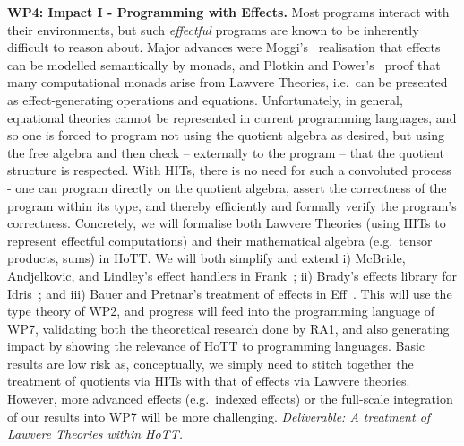 \documentclass[a4paper,11pt]{article}
\newcommand{\eg}{{e.g.}\ }
\begin{document}
{\bf WP4: Impact I - Programming with Effects.}
Most programs interact with their environments,
but such \emph{effectful} programs are known to be inherently difficult to
reason about.
Major advances were Moggi's~\cite{moggi:monad} realisation that effects can be modelled semantically by monads, and
Plotkin and Power's~\cite{PlotkinPower:Lawvere} proof that many
computational monads arise from Lawvere Theories, i.e.\ can be
presented as effect-generating operations and equations.
Unfortunately, in general, equational theories cannot be represented
in current programming languages, and so one is 
forced to program not using the quotient algebra as desired, but using
the free algebra and then check -- externally to the program -- that
the quotient structure is respected.  With HITs, there is no need for
such a convoluted process - one can program directly on the quotient
algebra, assert the correctness of the program within its type, and
thereby efficiently and formally verify the program's
correctness. Concretely, we will formalise both Lawvere Theories
(using HITs to represent effectful computations) and their
mathematical algebra (e.g.\ tensor products, sums) in HoTT.  We will
both simplify and extend i) McBride, Andjelkovic, and Lindley's effect
handlers in Frank~\cite{conor:frank}; ii) Brady's effects library for
Idris~\cite{brady:effects}; and iii) Bauer and Pretnar's treatment of
effects in Eff~\cite{bauer:eff}.  This will use the type 
theory of WP2, and progress will feed into the programming
language of WP7, validating both the theoretical research done by RA1,
and also generating impact by showing the relevance of HoTT to
programming languages. Basic results are low risk as,
conceptually, we simply need to stitch together the treatment of
quotients via HITs with that of effects via Lawvere theories.
However, more advanced effects (\eg indexed effects) or the full-scale
integration of our results into WP7 will be more challenging. {\em
  Deliverable: A treatment of Lawvere Theories within
  HoTT. 
}
\end{document}
